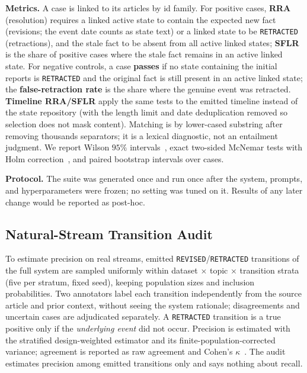 \documentclass[journal]{IEEEtran}
\begin{document}
\textbf{Metrics.} A case is linked to its articles by id family. For positive cases, \textbf{RRA} (resolution) requires a linked active state to contain the expected new fact (revisions; the event date counts as state text) or a linked state to be \texttt{RETRACTED} (retractions), and the stale fact to be absent from all active linked states; \textbf{SFLR} is the share of positive cases where the stale fact remains in an active linked state. For negative controls, a case \textbf{passes} if no state containing the initial reports is \texttt{RETRACTED} and the original fact is still present in an active linked state; the \textbf{false-retraction rate} is the share where the genuine event was retracted. \textbf{Timeline RRA/SFLR} apply the same tests to the emitted timeline instead of the state repository (with the length limit and date deduplication removed so selection does not mask content). Matching is by lower-cased substring after removing thousands separators; it is a lexical diagnostic, not an entailment judgment. We report Wilson $95\%$ intervals~\cite{wilson1927probable}, exact two-sided McNemar tests with Holm correction~\cite{holm1979simple}, and paired bootstrap intervals over cases.

\textbf{Protocol.} The suite was generated once and run once after the system, prompts, and hyperparameters were frozen; no setting was tuned on it. Results of any later change would be reported as post-hoc.

\subsection{Natural-Stream Transition Audit}
\label{subsec:audit_design}

To estimate precision on real streams, emitted \texttt{REVISED}/\texttt{RETRACTED} transitions of the full system are sampled uniformly within dataset $\times$ topic $\times$ transition strata (five per stratum, fixed seed), keeping population sizes and inclusion probabilities. Two annotators label each transition independently from the source article and prior context, without seeing the system rationale; disagreements and uncertain cases are adjudicated separately. A \texttt{RETRACTED} transition is a true positive only if the \emph{underlying event} did not occur. Precision is estimated with the stratified design-weighted estimator and its finite-population-corrected variance; agreement is reported as raw agreement and Cohen's $\kappa$~\cite{cohen1960coefficient}. The audit estimates precision among emitted transitions only and says nothing about recall.
\end{document}
